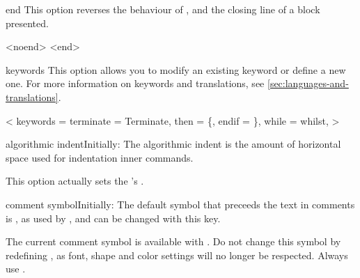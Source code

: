 \documentclass[a4paper, 11pt]{article}
\begin{document}
\begin{Optiondef}{end}{}
    This option reverses the behaviour of , and the closing line of a block presented.
\end{Optiondef}

\begin{PDExample}
    \begin{algorithmic}
        <noend>
                    <end>
                \EndIf
            \EndFor
        \EndFor
    \end{algorithmic}
\end{PDExample}

\begin{Optiondef}{keywords}{}{}
    This option allows you to modify an existing keyword or define a new one. For more information on keywords and translations, see \cref{sec:languages-and-translations}.
\end{Optiondef}

\begin{PDExample}
    \begin{algorithmic}
        <
        keywords = {
            terminate = Terminate, %
            then = \{, %
            endif = \}, %
            while = whilst,  %
        }
        >
        \While{\True}
            \EndIf
        \EndWhile
    \end{algorithmic}
\end{PDExample}

\begin{Optiondef}{algorithmic indent}{}{Initially: \PDInline{1.5em}}
    The algorithmic indent is the amount of horizontal space used for indentation inner commands.

    This option actually sets the 's .
\end{Optiondef}

\begin{Optiondef}{comment symbol}{}{Initially: \PDInline{$\triangleright$}}
    The default symbol that preceeds the text in comments is \CommentSymbol, as used by , and can be changed with this key.

    The current comment symbol is available with . Do not change this symbol by redefining , as font, shape and color settings will no longer be respected. Always use .
\end{Optiondef}
\end{document}

